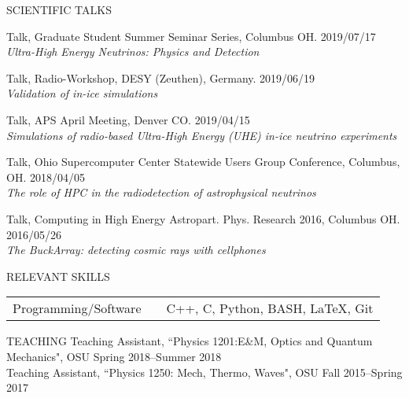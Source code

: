 \documentclass{resume} %
\begin{document}
\begin{rSection}{SCIENTIFIC TALKS}
\begin{etaremune}[]
\item Talk, Graduate Student Summer Seminar Series, Columbus OH. \hfill 2019/07/17 \\
{\em Ultra-High Energy Neutrinos: Physics and Detection} 
\item Talk, Radio-Workshop, DESY (Zeuthen), Germany. \hfill 2019/06/19 \\
{\em Validation of in-ice simulations} 
\item Talk, APS April Meeting, Denver CO. \hfill 2019/04/15 \\
{\em Simulations of radio-based Ultra-High Energy (UHE) in-ice neutrino experiments} 
\item Talk, Ohio Supercomputer Center Statewide Users Group Conference, Columbus, OH. \hfill 2018/04/05 \\
{\em The role of HPC in the radiodetection of astrophysical neutrinos} 
\item Talk, Computing in High Energy Astropart. Phys. Research 2016, Columbus OH. \hfill 2016/05/26 \\
{\em The BuckArray: detecting cosmic rays with cellphones} 
 \end{etaremune}
\end{rSection}
\vspace{-0.10cm}

\begin{rSection}{RELEVANT SKILLS}
\begin{tabular}{@{}l l l@{}}
 Programming/Software & & C++, C, Python, BASH,  \LaTeX, Git\\ 
\end{tabular}
\end{rSection}

\begin{rSection}{TEACHING}
Teaching Assistant, ``Physics 1201:E\&M, Optics and Quantum Mechanics", OSU \hfill {Spring 2018--Summer 2018}\\
Teaching Assistant, ``Physics 1250: Mech, Thermo, Waves", OSU \hfill {Fall 2015--Spring 2017}\\
\end{rSection}
\vspace{-0.35cm}
\end{document}
